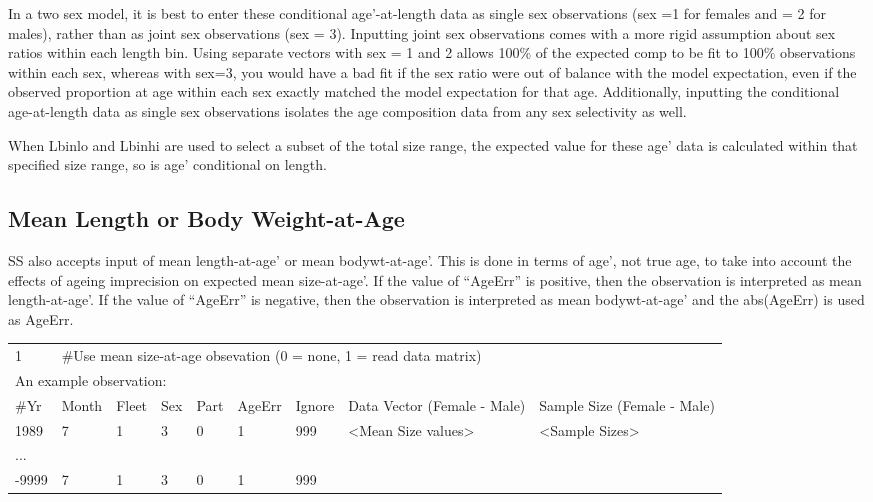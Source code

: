 In a two sex model, it is best to enter these conditional age’-at-length data as single sex observations (sex =1 for females and = 2 for males), rather than as joint sex observations (sex = 3).  Inputting joint sex observations comes with a more rigid assumption about sex ratios within each length bin. Using separate vectors with sex = 1 and 2 allows 100\% of the expected comp to be fit to 100\% observations within each sex, whereas with sex=3, you would have a bad fit if the sex ratio were out of balance with the model expectation, even if the observed proportion at age within each sex exactly matched the model expectation for that age.  Additionally, inputting the conditional age-at-length data as single sex observations isolates the age composition data from any sex selectivity as well.

When Lbin\textunderscore lo and Lbin\textunderscore hi are used to select a subset of the total size range, the expected value for these age’ data is calculated within that specified size range, so is age’ conditional on length.


\subsection{Mean Length or Body Weight-at-Age}
SS also accepts input of mean length-at-age’ or mean bodywt-at-age’.  This is done in terms of age’, not true age, to take into account the effects of ageing imprecision on expected mean size-at-age’.  If the value of “AgeErr” is positive, then the observation is interpreted as mean length-at-age’.  If the value of “AgeErr” is negative, then the observation is interpreted as mean bodywt-at-age’ and the abs(AgeErr) is used as AgeErr.

\begin{center}
	\begin{tabular}{p{0.75cm} p{1cm} p{0.75cm} p{1cm} p{0.75cm} p{1cm} p{1cm} p{3.2cm} p{3.2cm} }
		\hline
		1 & \multicolumn{8}{l}{\#Use mean size-at-age obsevation (0 = none, 1 = read data matrix)} \\
		\multicolumn{9}{l}{An example observation:}\\
		\hline
		\#Yr & Month & Fleet & Sex & Part & AgeErr & Ignore & Data Vector (Female - Male) & Sample Size (Female - Male) \\
		\hline
		1989  & 7 & 1 & 3 & 0 & 1 & 999 & <Mean Size values> & <Sample Sizes> \\
		...   &   &   &   &   &   &   &  & \\
		-9999 & 7 & 1 & 3 & 0 & 1 & 999 &  & \\
		\hline
	\end{tabular}
\end{center}

